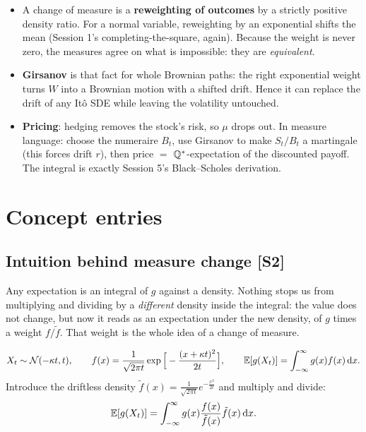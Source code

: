 \documentclass[10pt]{article}
\begin{document}
\begin{itemize}
\item A change of measure is a \textbf{reweighting of outcomes} by a strictly positive density ratio. For a normal variable, reweighting by an exponential shifts the mean (Session 1's completing-the-square, again). Because the weight is never zero, the measures agree on what is impossible: they are \emph{equivalent}.
\item \textbf{Girsanov} is that fact for whole Brownian paths: the right exponential weight turns $W$ into a Brownian motion with a shifted drift. Hence it can replace the drift of any It\^o SDE while leaving the volatility untouched.
\item \textbf{Pricing}: hedging removes the stock's risk, so $\mu$ drops out. In measure language: choose the numeraire $B_t$, use Girsanov to make $S_t/B_t$ a martingale (this forces drift $r$), then price $=$ $\mathbb{Q}^*$-expectation of the discounted payoff. The integral is exactly Session 5's Black--Scholes derivation.
\end{itemize}

\section{Concept entries}

\subsection{Intuition behind measure change [S2]}
\begin{idea}
Any expectation is an integral of $g$ against a density. Nothing stops us from multiplying and dividing by a \emph{different} density inside the integral: the value does not change, but now it reads as an expectation under the new density, of $g$ times a weight $f/\tilde f$. That weight is the whole idea of a change of measure.
\end{idea}
\[X_t\sim\mathcal{N}(-\kappa t,t),\qquad f(x)=\frac{1}{\sqrt{2\pi t}}\exp\Big[-\frac{(x+\kappa t)^2}{2t}\Big],\qquad \mathbb{E}[g(X_t)]=\int_{-\infty}^\infty g(x)f(x)\,\mathrm{d} x.\]
Introduce the driftless density $\tilde f(x)=\frac{1}{\sqrt{2\pi t}}e^{-\frac{x^2}{2t}}$ and multiply and divide:
\[\mathbb{E}[g(X_t)]=\int_{-\infty}^\infty g(x)\frac{f(x)}{\tilde f(x)}\tilde f(x)\,\mathrm{d} x.\]
\begin{where}
\end{where}
\end{document}
